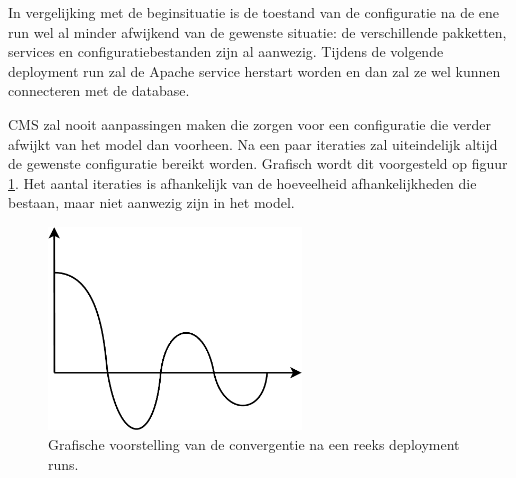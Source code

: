 In vergelijking met de beginsituatie is de toestand van de configuratie na de ene run wel al minder afwijkend van de gewenste situatie:
de verschillende pakketten, services en configuratiebestanden zijn al aanwezig.
Tijdens de volgende deployment run zal de Apache service herstart worden en dan zal ze wel kunnen connecteren met de database.

CMS zal nooit aanpassingen maken die zorgen voor een configuratie die verder afwijkt van het model dan voorheen.
Na een paar iteraties zal uiteindelijk altijd de gewenste configuratie bereikt worden. 
Grafisch wordt dit voorgesteld op figuur \ref{fig:convergentie}.
Het aantal iteraties is afhankelijk van de hoeveelheid afhankelijkheden die bestaan, maar niet aanwezig zijn in het model.

\begin{figure}
    \begin{center}
    \includegraphics[width=0.6\textwidth]{images/convergentie.pdf}
    \caption{Grafische voorstelling van de convergentie na een reeks deployment runs.}
    \label{fig:convergentie}
    \end{center}
\end{figure}

